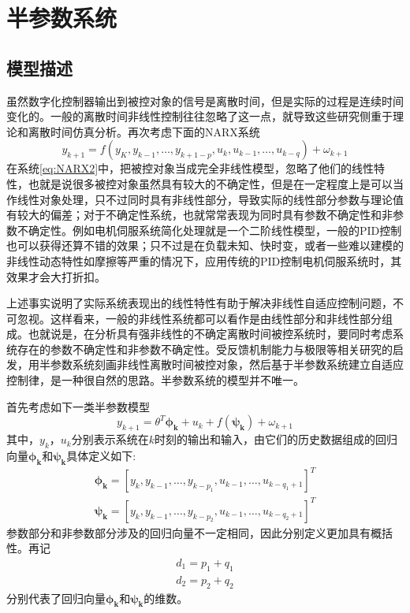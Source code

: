 \section{半参数系统}
\label{sect:2.2}
\subsection{模型描述}
\label{subsec:2.2.1}
虽然数字化控制器输出到被控对象的信号是离散时间，但是实际的过程是连续时间变化的。一般的离散时间非线性控制往往忽略了这一点，就导致这些研究侧重于理论和离散时间仿真分析。再次考虑下面的NARX系统
\begin{equation}%
\label{eq:NARX2}
y_{k+1} = f(y_{K},y_{k-1},\ldots,y_{k+1-p},u_{k},u_{k-1},\ldots,u_{k-q})+\omega_{k+1}
\end{equation}
在系统\eqref{eq:NARX2}中，把被控对象当成完全非线性模型，忽略了他们的线性特性，也就是说很多被控对象虽然具有较大的不确定性，但是在一定程度上是可以当作线性对象处理，只不过同时具有非线性部分，导致实际的线性部分参数与理论值有较大的偏差；对于不确定性系统，也就常常表现为同时具有参数不确定性和非参数不确定性。例如电机伺服系统简化处理就是一个二阶线性模型，一般的PID控制也可以获得还算不错的效果；只不过是在负载未知、快时变，或者一些难以建模的非线性动态特性如摩擦等严重的情况下，应用传统的PID控制电机伺服系统时，其效果才会大打折扣。

上述事实说明了实际系统表现出的线性特性有助于解决非线性自适应控制问题，不可忽视。这样看来，一般的非线性系统都可以看作是由线性部分和非线性部分组成。也就说是，在分析具有强非线性的不确定离散时间被控系统时，要同时考虑系统存在的参数不确定性和非参数不确定性。受反馈机制能力与极限等相关研究的启发，用半参数系统刻画非线性离散时间被控对象，然后基于半参数系统建立自适应控制律，是一种很自然的思路。半参数系统的模型并不唯一。

首先考虑如下一类半参数模型
\begin{equation}%
\label{eq:semi-u}
y_{k+1} = \theta^{T}\bm{\phi_{k}}+u_{k}+f(\bm{\psi_{k}})+\omega_{k+1}
\end{equation}
其中，$y_{k}$，$u_{k}$分别表示系统在$k$时刻的输出和输入，由它们的历史数据组成的回归向量$\bm{\phi_{k}}$和$\bm{\psi_{k}}$具体定义如下:
\begin{eqnarray}
\bm{\phi_{k}}=[y_{k},y_{k-1},\ldots,y_{k-p_{1}},u_{k-1},\dots,u_{k-q_{1}+1}]^{T}\\
\bm{\psi_{k}}=[y_{k},y_{k-1},\ldots,y_{k-p_{2}},u_{k-1},\dots,u_{k-q_{2}+1}]^{T}
\end{eqnarray}
参数部分和非参数部分涉及的回归向量不一定相同，因此分别定义更加具有概括性。再记
\begin{eqnarray}
d_{1}=p_{1}+q_{1}\\
d_{2}=p_{2}+q_{2}
\end{eqnarray}
分别代表了回归向量$\bm{\phi_{k}}$和$\bm{\psi_{k}}$的维数。

